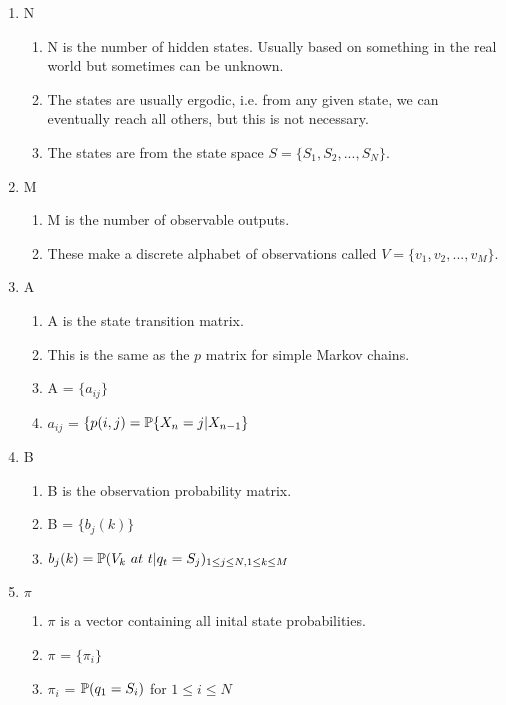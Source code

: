 \begin{enumerate}
    \item N \begin{enumerate}[i]
        \item N is the number of hidden states. Usually based on something in the real world but sometimes can be unknown.
        \item The states are usually ergodic, i.e. from any given state, we can eventually reach all others, but this is not necessary.
        \item The states are from the state space $S = \{S_1,S_2,...,S_N\}$.
        \end{enumerate}
    \item M \begin{enumerate}[i]
        \item M is the number of observable outputs.
        \item These make a discrete alphabet of observations called $V = \{v_1, v_2,...,v_M\}$.
    \end{enumerate}
    \item A \begin{enumerate}[i]
        \item A is the state transition matrix.
        \item This is the same as the $p$ matrix for simple Markov chains.
        \item A = $\{a_{ij}\}$ 
        \item $a_{ij}$ = $\{ p(i,j) = \mathbb{P} \{ X_n = j | X_{n-1}\}$
    \end{enumerate}
    \item B \begin{enumerate}[i]
        \item B is the observation probability matrix.
        \item B = $\{b_j(k)\}$
        \item $b_j(k) = \mathbb{P} (V_k \  at \  t | q_t = S_j)_{1 \leq j \leq N, 1 \leq k \leq M}$
    \end{enumerate}
    \item $\pi$ \begin{enumerate}[i]
        \item $\pi$ is a vector containing all inital state probabilities. 
        \item $\pi$ = $\{ \pi_i \}$
        \item $\pi_i$ = $\mathbb{P} (q_1 = S_i)$ for $1 \leq i \leq N$
    \end{enumerate}
\end{enumerate}


